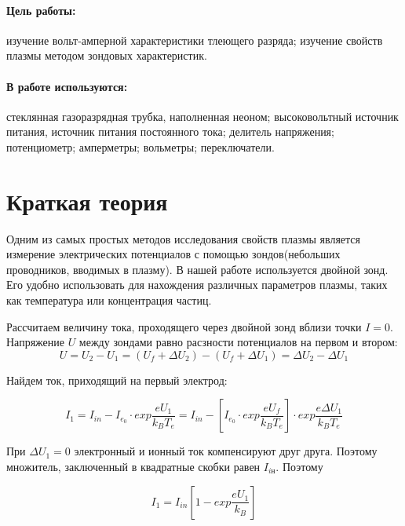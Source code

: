 \documentclass[a4paper, 14pt]{extarticle}%
\date{}
\begin{document}
\maketitle
\paragraph{Цель работы:}изучение вольт-амперной характеристики тлеющего разряда; изучение свойств плазмы методом зондовых характеристик.
\paragraph{В работе используются:} стеклянная газоразрядная трубка, наполненная неоном; высоковольтный источник питания, источник питания постоянного тока; делитель напряжения; потенциометр; амперметры; вольметры; переключатели. 

\section{Краткая теория}

Одним из самых простых методов исследования свойств плазмы является измерение электрических потенциалов с помощью зондов(небольших проводников, вводимых в плазму). В нашей работе используется двойной зонд. Его удобно использовать для нахождения различных параметров плазмы, таких как температура или концентрация частиц.

Рассчитаем величину тока, проходящего через двойной зонд вблизи точки $I=0$. 
Напряжение $U$ между зондами равно расзности потенциалов на первом и втором:
\begin{equation}
    U = U_{2}-U_{1}= (U_{f}+\Delta U_{2}) - (U_{f}+\Delta U_{1}) = \Delta U_{2} - \Delta U_{1}
\end{equation}

Найдем ток, приходящий на первый электрод:

   \[I_{1} = I_{in} - I_{e_0} \cdot exp{\frac{e U_{1}}{k_{B} T_{e}}} = I_{in} - \left[I_{e_0} \cdot exp{\frac{e U_{f}}{k_{B} T_{e}}} \right] \cdot exp{\frac{e \Delta U_{1}}{k_{B} T_{e}}} \]
   
   
При $\Delta U_{1} = 0$ электронный и ионный ток компенсируют друг друга. Поэтому множитель, заключенный в квадратные скобки равен $I_{iн}$. Поэтому

\begin{equation}
   I_{1} = I_{in} \left[1 - exp{\frac{e U_{1}}{k_{B}}} \right]
\end{equation}
\end{document}
